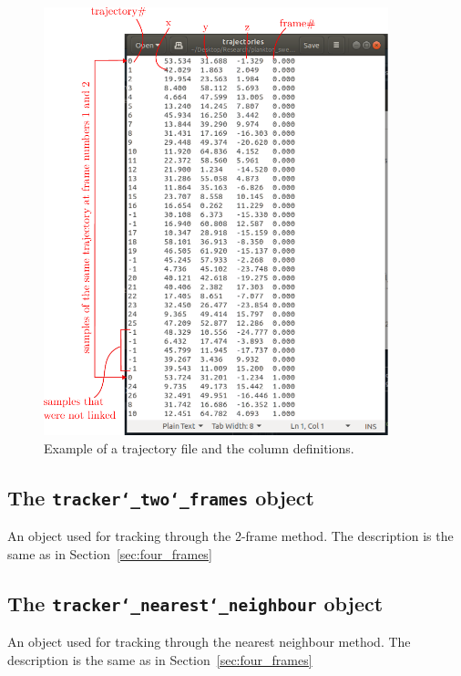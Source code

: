 \documentclass[10pt,a4paper]{article}
\begin{document}
\begin{figure}
	\centering
	\includegraphics[width=10cm]{trajectory_files.pdf}
	\caption{Example of a trajectory file and the column definitions. \label{fig:trajfile}}
\end{figure}




\subsection{The \texttt{tracker\char`_two\char`_frames} object}

An object used for tracking through the 2-frame method. The description is the same as in Section~\ref{sec:four_frames}



\subsection{The \texttt{tracker\char`_nearest\char`_neighbour} object}

An object used for tracking through the nearest neighbour method. The description is the same as in Section~\ref{sec:four_frames}











\end{document}
